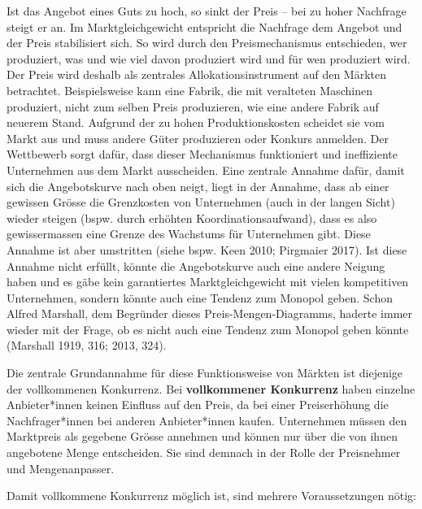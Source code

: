 \documentclass[
  nswissgerman,
  a4paper,
  DIV=11,
  numbers=noendperiod,
  oneside,
  openany]{scrreprt}
\begin{document}
Ist das Angebot eines Guts zu hoch, so sinkt der Preis -- bei zu hoher
Nachfrage steigt er an. Im Marktgleichgewicht entspricht die Nachfrage
dem Angebot und der Preis stabilisiert sich. So wird durch den
Preismechanismus entschieden, wer produziert, was und wie viel davon
produziert wird und für wen produziert wird. Der Preis wird deshalb als
zentrales Allokationsinstrument auf den Märkten betrachtet.
Beispielsweise kann eine Fabrik, die mit veralteten Maschinen
produziert, nicht zum selben Preis produzieren, wie eine andere Fabrik
auf neuerem Stand. Aufgrund der zu hohen Produktionskosten scheidet sie
vom Markt aus und muss andere Güter produzieren oder Konkurs anmelden.
Der Wettbewerb sorgt dafür, dass dieser Mechanismus funktioniert und
ineffiziente Unternehmen aus dem Markt ausscheiden. Eine zentrale
Annahme dafür, damit sich die Angebotskurve nach oben neigt, liegt in
der Annahme, dass ab einer gewissen Grösse die Grenzkosten von
Unternehmen (auch in der langen Sicht) wieder steigen (bspw. durch
erhöhten Koordinationsaufwand), dass es also gewissermassen eine Grenze
des Wachstums für Unternehmen gibt. Diese Annahme ist aber umstritten
(siehe bspw. Keen 2010; Pirgmaier 2017). Ist diese Annahme nicht
erfüllt, könnte die Angebotskurve auch eine andere Neigung haben und es
gäbe kein garantiertes Marktgleichgewicht mit vielen kompetitiven
Unternehmen, sondern könnte auch eine Tendenz zum Monopol geben. Schon
Alfred Marshall, dem Begründer dieses Preis-Mengen-Diagramms, haderte
immer wieder mit der Frage, ob es nicht auch eine Tendenz zum Monopol
geben könnte (Marshall 1919, 316; 2013, 324).

Die zentrale Grundannahme für diese Funktionsweise von Märkten ist
diejenige der vollkommenen Konkurrenz. Bei \textbf{vollkommener
Konkurrenz} haben einzelne Anbieter*innen keinen Einfluss auf den Preis,
da bei einer Preiserhöhung die Nachfrager*innen bei anderen
Anbieter*innen kaufen. Unternehmen müssen den Marktpreis als gegebene
Grösse annehmen und können nur über die von ihnen angebotene Menge
entscheiden. Sie sind demnach in der Rolle der Preisnehmer und
Mengenanpasser.

Damit vollkommene Konkurrenz möglich ist, sind mehrere Voraussetzungen
nötig:
\end{document}

